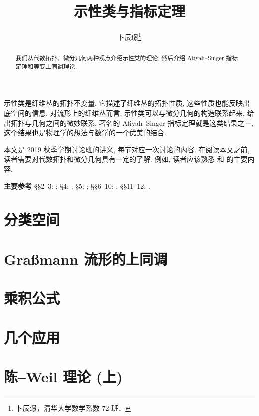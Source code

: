 \documentclass[twoside]{article}
\begin{document}
\title{示性类与指标定理}
\author{卜辰璟\footnote{卜辰璟，清华大学数学系数 72 班．}}

\begin{abstract}
    我们从代数拓扑、微分几何两种观点介绍示性类的理论, 
    然后介绍 Atiyah--Singer 指标定理和等变上同调理论.
\end{abstract}

示性类是纤维丛的拓扑不变量. 
它描述了纤维丛的拓扑性质, 这些性质也能反映出底空间的信息.
对流形上的纤维丛而言, 示性类可以与微分几何的构造联系起来, 
给出拓扑与几何之间的微妙联系. 
著名的 Atiyah--Singer 指标定理就是这类结果之一,
这个结果也是物理学的想法与数学的一个优美的结合.

本文是 2019 秋季学期讨论班的讲义, 每节对应一次讨论的内容. 
在阅读本文之前, 读者需要对代数拓扑和微分几何具有一定的了解.
例如, 读者应该熟悉 \cite{may} 和 \cite{do-carmo} 的主要内容.

\tableofcontents

\bigskip
\begin{trivlist}
    \item [\textbf{主要参考\enspace}]
        \S\S2--3: \cite{cohen};
        \S4: \cite{milnor-stasheff};
        \S5: \cite{rahman};
        \S\S6--10: \cite{bgv};
        \S\S11--12: \cite{libine}.
\end{trivlist}

\clearpage

\section{分类空间} \label{sect-1}



\section{Graßmann 流形的上同调} \label{sect-2}



\section{乘积公式} \label{sect-3}



\section{几个应用} \label{sect-4}



\section{陈--Weil 理论 (上)} \label{sect-5}
\end{document}
